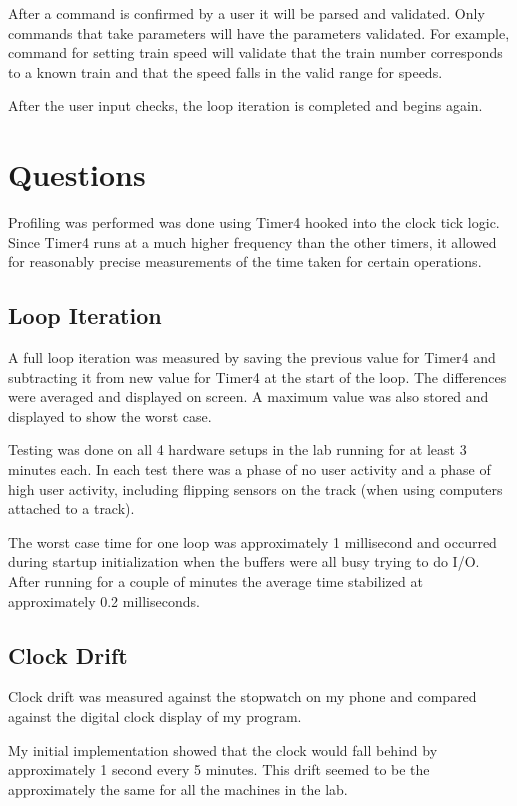 \documentclass[pdftex,10pt,a4paper]{article}
\begin{document}
After a command is confirmed by a user it will be parsed and
validated. Only commands that take parameters will have the parameters
validated. For example,  command for setting train speed will
validate that the train number corresponds to a known train and that
the speed falls in the valid range for speeds.

After the user input checks, the loop iteration is completed and
begins again.


\section*{Questions}

Profiling was performed was done using Timer4 hooked into the clock
tick logic. Since Timer4 runs at a much higher frequency than the
other timers, it allowed for reasonably precise measurements of the
time taken for certain operations.

\subsection*{Loop Iteration}

A full loop iteration was measured by saving the previous value for
Timer4 and subtracting it from new value for Timer4 at the start of
the loop. The differences were averaged and displayed on screen. A
maximum value was also stored and displayed to show the worst case.

Testing was done on all 4 hardware setups in the lab running for at
least 3 minutes each. In each test there was a phase of no user
activity and a phase of high user activity, including flipping sensors
on the track (when using computers attached to a track).

The worst case time for one loop was approximately 1 millisecond and
occurred during startup initialization when the buffers were all busy
trying to do I/O. After running for a couple of minutes the average
time stabilized at approximately 0.2 milliseconds.

\subsection*{Clock Drift}

Clock drift was measured against the stopwatch on my phone and
compared against the digital clock display of my program.

My initial implementation showed that the clock would fall behind by
approximately 1 second every 5 minutes. This drift seemed to be the
approximately the same for all the machines in the lab.
\end{document}
